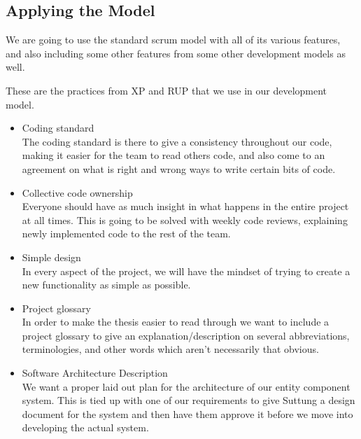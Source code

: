 \subsection{Applying the Model}
We are going to use the standard scrum model with all of its various features, and also including some other features from some other development models as well.

These are the practices from XP and RUP that we use in our development model. 
\begin{itemize}
    \item Coding standard\\
    The coding standard is there to give a consistency throughout our code, making it easier for the team to read others code, and also come to an agreement on what is right and wrong ways to write certain bits of code.

    \item Collective code ownership\\
    Everyone should have as much insight in what happens in the entire project at all times.
    This is going to be solved with weekly code reviews, 
    explaining newly implemented code to the rest of the team.

    \item Simple design\\
    In every aspect of the project, we will have the mindset of
    trying to create a new functionality as simple as possible. 

    \item Project glossary\\
    In order to make the thesis easier to read through we want to include a project
    glossary to give an explanation/description on several abbreviations,
    terminologies, and other words which aren't necessarily that obvious.

    \item Software Architecture Description\\
    We want a proper laid out plan for the architecture of our entity component system. 
    This is tied up with one of our requirements to give Suttung a design document for
    the system and then have them approve it before we move into developing the actual system.

\end{itemize}

